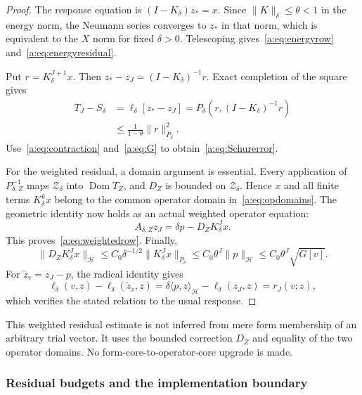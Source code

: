 \documentclass[11pt,a4paper]{article}
\numberwithin{equation}{section}
\theoremstyle{definition}\newtheorem{definition}[theorem]{Definition}
\theoremstyle{remark}\newtheorem{remark}[theorem]{Remark}
\newcommand{\Hh}{\mathcal H}\newcommand{\Hw}{\mathcal H}
\newcommand{\dom}{\operatorname{Dom}}\newcommand{\Var}{\operatorname{Var}}
\newcommand{\ip}[2]{\langle#1,#2\rangle}\newcommand{\norm}[1]{\lVert#1\rVert}\newcommand{\abs}[1]{\lvert#1\rvert}
\newcommand{\Zc}{\mathcal Z_\delta}\newcommand{\Rcal}{\mathcal R}
\begin{document}
\begin{proof}
The response equation is $(I-K_\delta)z_*=x$. Since $\norm K_\delta\le\theta<1$ in the energy norm, the Neumann series converges to $z_*$ in that norm, which is equivalent to the $X$ norm for fixed $\delta>0$. Telescoping gives~\eqref{a:eq:energyrow} and~\eqref{a:eq:energyresidual}.

Put $r=K_\delta^{J+1}x$. Then
$z_*-z_J=(I-K_\delta)^{-1}r$. Exact completion of the square gives
\begin{align*}
 T_J-S_\delta
 &=\ell_\delta[z_*-z_J]
 =P_\delta(r,(I-K_\delta)^{-1}r)\\
 &\le\frac1{1-\theta}\norm r_{P_\delta}^2.
\end{align*}
Use~\eqref{a:eq:contraction} and~\eqref{a:eq:G} to obtain~\eqref{a:eq:Schurerror}.

For the weighted residual, a domain argument is essential. Every application of $P_{\delta,Z}^{-1}$ maps $\Zc$ into $\dom T_Z$, and $D_Z$ is bounded on $\Zc$. Hence $x$ and all finite terms $K_\delta^kx$ belong to the common operator domain in~\eqref{a:eq:opdomains}. The geometric identity now holds as an actual weighted operator equation:
\[
 A_{\delta,Z}z_J=\delta p-D_ZK_\delta^Jx.
\]
This proves~\eqref{a:eq:weightedrow}. Finally,
\[
 \norm{D_ZK_\delta^Jx}_{\Hh}
 \le C_0\delta^{-1/2}\norm{K_\delta^Jx}_{P_\delta}
 \le C_0\theta^J\norm p_{\Hh}
 \le C_0\theta^J\sqrt{G[v]}.
\]
For $\widetilde z_v=z_J-p$, the radical identity gives
\[
 \ell_\delta(v,z)-\ell_\delta(\widetilde z_v,z)
 =\delta\ip pz_{\Hh}-\ell_\delta(z_J,z)=r_J(v;z),
\]
which verifies the stated relation to the usual response.
\end{proof}

This weighted residual estimate is not inferred from mere form membership of an arbitrary trial vector. It uses the bounded correction $D_Z$ and equality of the two operator domains. No form-core-to-operator-core upgrade is made.

\subsubsection{Residual budgets and the implementation boundary}
\end{document}
